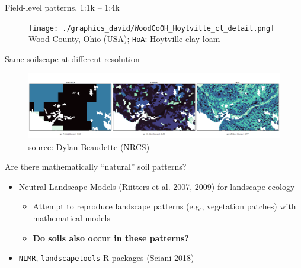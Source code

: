 \documentclass[aspectratio=169]{beamer}
\begin{document}
\begin{frame}{Field-level patterns, 1:1k -- 1:4k}
        \begin{figure}
        \centering
\texttt{[image: ./graphics\_david/WoodCoOH\_Hoytville\_cl\_detail.png]}\\
{Wood County, Ohio (USA); \texttt{HoA}: Hoytville clay loam}
     \end{figure}
\end{frame}

\begin{frame}{Same soilscape at different resolution}
    \begin{figure}
        \centering
        \includegraphics[width=\linewidth]{./graphics_david/Dylan_ND005-example-01.png}
\\source: Dylan Beaudette (NRCS)
    \end{figure}
\end{frame}

\begin{frame}{Are there mathematically ``natural'' soil patterns?}
\begin{itemize}
    \item Neutral Landscape Models (Riitters et al. 2007, 2009) for landscape ecology
    \begin{itemize}
        \item Attempt to reproduce landscape patterns (e.g., vegetation patches) with mathematical models
        \item \textbf{Do soils also occur in these patterns?}
    \end{itemize}
    \item \texttt{NLMR}, \texttt{landscapetools} R packages (Sciani 2018)
\end{itemize}
\end{frame}
\end{document}
